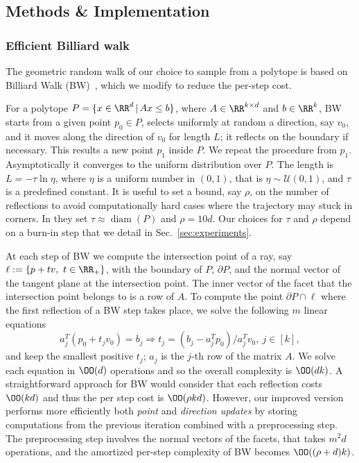 \subsection{Methods \& Implementation}
\label{sec:mmcs-methods}

\subsubsection*{Efficient Billiard walk}
\label{subsec:mmcs-methods-bw}

   The geometric random walk of our choice
   to sample from a polytope
   is based on  Billiard Walk (BW)~\citep{Gryazina14},
   which we modify to reduce the per-step cost.

   For a polytope $P = \{ x \in \RR^d \,|\, A x \leq b  \}$,
   where $A \in \RR^{k \times d}$ and $b \in \RR^k$,
   BW starts from a given point $p_0 \in P$,
   selects uniformly at random a
   direction, say $v_0$, and it moves along the direction of $v_0$ for length $L$;
   it reflects on the boundary if necessary. This results a new point $p_1$ inside
   $P$. We repeat the procedure from $p_1$. Asymptotically it converges to the
   uniform distribution over $P$. The length is $L=-\tau \ln \eta$, where $\eta$ is
   a uniform number in $(0,1)$, that is $\eta\sim\mathcal{U}(0,1)$, and $\tau$ is a
   predefined constant. It is useful to set a bound, say $\rho$, on the number of
   reflections to avoid computationally hard cases where the trajectory may stuck
   in corners. In \citep{Gryazina14} they set
   $\tau \approx \mathop{diam}(P)$ and $\rho =10d$.
   Our choices for $\tau$ and $\rho$ depend on a
   burn-in step that we detail in  Sec.~\ref{sec:experiments}.

   At each step of BW we
   compute the intersection point of a ray, say $\ell:=\{p+tv,\ t\in\RR_+ \}$,
   with the boundary of $P$, $\partial P$, and the normal vector of the tangent
   plane at the intersection point.
   The inner vector of the facet that the intersection  point belongs to is a row of $A$.
   To compute the point $\partial P\cap\ell$ where the first reflection of a BW
   step takes place, we solve the following $m$ linear equations
   \begin{equation}\label{eq:boundary_oracle}
   a_j^T(p_0 + t_jv_0) = b_j \Rightarrow t_j = (b_j - a_j^Tp_0) / a_j^Tv_0,\ j \in[k],
   \end{equation}
   and keep the smallest positive $t_j$; $a_j$ is the $j$-th row of the matrix $A$.
   We solve each equation in $\OO(d)$ operations
   and so the overall complexity is $\OO(dk)$.
   A straightforward approach for BW would consider that each reflection costs $\OO(kd)$ and thus the per step cost is $\OO(\rho kd)$.
   However, our improved version performs more efficiently both \textit{point} and \textit{direction updates} by storing computations from the previous iteration combined with a preprocessing step. The preprocessing step involves the normal vectors of the facets, that takes $m^2 d$ operations,
   and the amortized per-step complexity of BW becomes $\OO((\rho + d)k)$.

